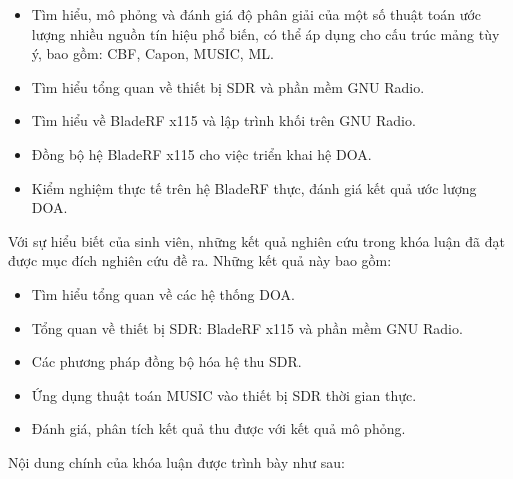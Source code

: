 
\renewcommand{\labelitemi}{$-$}
\begin{itemize}
	\item Tìm hiểu, mô phỏng và đánh giá độ phân giải của một số thuật toán ước lượng nhiều nguồn tín hiệu phổ biến, có thể áp dụng cho cấu trúc mảng tùy ý, bao gồm: CBF, Capon, MUSIC, ML.
	\item Tìm hiểu tổng quan về thiết bị SDR và phần mềm GNU Radio.
	\item Tìm hiểu về BladeRF x115 và lập trình khối trên GNU Radio.
	\item Đồng bộ hệ BladeRF x115 cho việc triển khai hệ DOA.
	\item Kiểm nghiệm thực tế trên hệ BladeRF thực, đánh giá kết quả ước lượng DOA.
\end{itemize} 
\vspace{0.3cm}


Với sự hiểu biết của sinh viên, những kết quả nghiên cứu trong khóa luận đã đạt được mục đích nghiên cứu đề ra. Những kết quả này bao gồm:

\renewcommand{\labelitemi}{$-$}
\begin{itemize}
	\item Tìm hiểu tổng quan về các hệ thống DOA.
	\item Tổng quan về thiết bị SDR: BladeRF x115 và phần mềm GNU Radio.
	\item Các phương pháp đồng bộ hóa hệ thu SDR.
	\item Ứng dụng thuật toán MUSIC vào thiết bị SDR thời gian thực.
	\item Đánh giá, phân tích kết quả thu được với kết quả mô phỏng.
\end{itemize} 

\vspace{0.5cm}

Nội dung chính của khóa luận được trình bày như sau:

